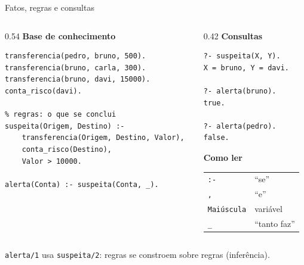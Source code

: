 \documentclass[aspectratio=169,11pt,xcolor=table]{beamer}
\newcommand{\fonte}[1]{\par\vfill{\scriptsize\color{muted}#1}}
\begin{document}
\begin{frame}[fragile]{Fatos, regras e consultas}
  \begin{columns}[T]
    \begin{column}{0.54\textwidth}
      \small\textbf{Base de conhecimento}
\begin{lstlisting}[style=pl]
% fatos: o que é verdade
transferencia(pedro, bruno, 500).
transferencia(bruno, carla, 300).
transferencia(bruno, davi, 15000).
conta_risco(davi).

% regras: o que se conclui
suspeita(Origem, Destino) :-
    transferencia(Origem, Destino, Valor),
    conta_risco(Destino),
    Valor > 10000.

alerta(Conta) :- suspeita(Conta, _).
\end{lstlisting}
    \end{column}
    \begin{column}{0.42\textwidth}
      \small\textbf{Consultas}
\begin{lstlisting}[style=pl]
?- suspeita(X, Y).
X = bruno, Y = davi.

?- alerta(bruno).
true.

?- alerta(pedro).
false.
\end{lstlisting}
      \vspace{6pt}
      \footnotesize\textbf{Como ler}\\[2pt]
      \begin{tabular}{@{}l l@{}}
        \texttt{:-} & ``se'' \\
        \texttt{,} & ``e'' \\
        \textcolor{accent}{\texttt{Maiúscula}} & variável \\
        \texttt{\_} & ``tanto faz''
      \end{tabular}
    \end{column}
  \end{columns}
  \fonte{\texttt{alerta/1} usa \texttt{suspeita/2}: regras se constroem sobre regras (inferência).}
\end{frame}
\end{document}
